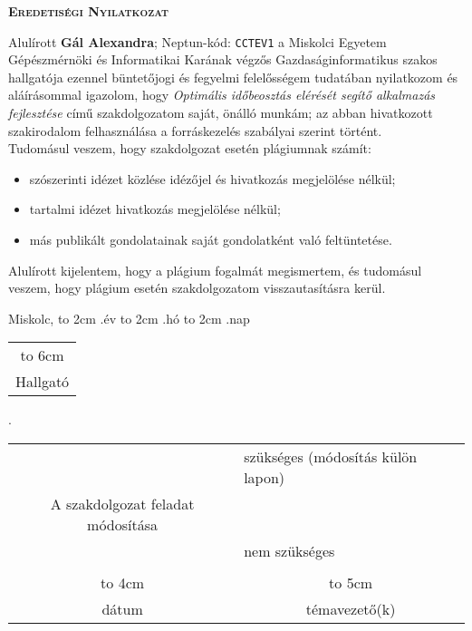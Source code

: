 \newpage

\vspace*{1cm}  
\begin{center}
\large\textsc{\bfseries Eredetiségi Nyilatkozat}
\end{center}
\vspace*{2cm}  

Alulírott \textbf{Gál Alexandra}; Neptun-kód: \texttt{CCTEV1} a Miskolci Egyetem Gépészmérnöki és Informatikai Karának végzős Gazdaságinformatikus szakos hallgatója ezennel büntetőjogi és fegyelmi felelősségem tudatában nyilatkozom és aláírásommal igazolom, hogy \textit{Optimális időbeosztás elérését segítő alkalmazás fejlesztése} című szakdolgozatom saját, önálló munkám; az abban hivatkozott szakirodalom felhasználása a forráskezelés szabályai szerint történt.\\

Tudomásul veszem, hogy szakdolgozat esetén plágiumnak számít:
\begin{itemize}
\item szószerinti idézet közlése idézőjel és hivatkozás megjelölése nélkül;
\item tartalmi idézet hivatkozás megjelölése nélkül;
\item más publikált gondolatainak saját gondolatként való feltüntetése.
\end{itemize}

Alulírott kijelentem, hogy a plágium fogalmát megismertem, és tudomásul veszem, hogy
plágium esetén szakdolgozatom visszautasításra kerül.

\vspace*{3cm}

\noindent Miskolc, \hbox to 2cm{\dotfill} .év \hbox to 2cm{\dotfill} .hó \hbox to 2cm{\dotfill} .nap

\vspace*{3cm}

\hspace*{8cm}\begin{tabular}{c}
\hbox to 6cm{\dotfill}\\
Hallgató
\end{tabular}



\newpage

.

\begin{tabular}{cl}
&szükséges (módosítás külön lapon) \\
A szakdolgozat feladat módosítása& \\
& nem szükséges\\
&\\
\hbox to 4cm{\dotfill}&\multicolumn{1}{c}{\hbox to 5cm{\dotfill}}\\
dátum& \multicolumn{1}{c}{témavezető(k)}
\end{tabular}
\vskip1.5mm

